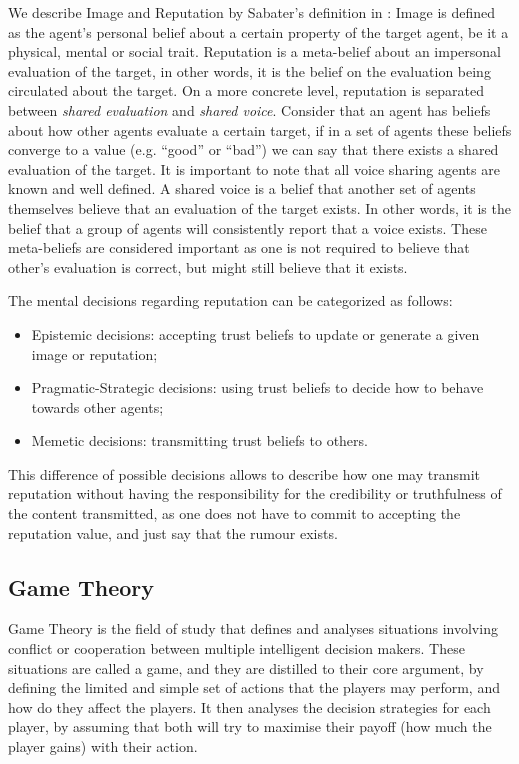 We describe Image and Reputation by Sabater's definition in \cite{Sabater2006}:
Image is defined as the agent's personal belief about a certain property of the target agent, be it a physical, mental or social trait. Reputation is a meta-belief about an impersonal evaluation of the target, in other words, it is the belief on the evaluation being circulated about the target. On a more concrete level, reputation is separated between \textit{shared evaluation} and \textit{shared voice}. Consider that an agent has beliefs about how other agents evaluate a certain target, if in a set of agents these beliefs converge to a value (e.g. ``good'' or ``bad'') we can say that there exists a shared evaluation of the target. It is important to note that all voice sharing agents are known and well defined. A shared voice is a belief that another set of agents themselves believe that an evaluation of the target exists. In other words, it is the belief that a group of agents will consistently report that a voice exists. These meta-beliefs are considered important as one is not required to believe that other's evaluation is correct, but might still believe that it exists.

The mental decisions regarding reputation can be categorized as follows:
\begin{itemize}
	\item Epistemic decisions: accepting trust beliefs to update or generate a given image or reputation;
	\item Pragmatic-Strategic decisions: using trust beliefs to decide how to behave towards other agents;
	\item Memetic decisions: transmitting trust beliefs to others. 
\end{itemize}
This difference of possible decisions allows to describe how one may transmit reputation without having the responsibility for the credibility or truthfulness of the content transmitted, as one does not have to commit to accepting the reputation value, and just say that the rumour exists.


\subsection{Game Theory}
\label{subsec:GameTheory}
Game Theory is the field of study that defines and analyses situations involving conflict or cooperation between multiple intelligent decision makers. These situations are called a game, and they are distilled to their core argument, by defining the limited and simple set of actions that the players may perform, and how do they affect the players. It then analyses the decision strategies for each player, by assuming that both will try to maximise their payoff (how much the player gains) with their action.


